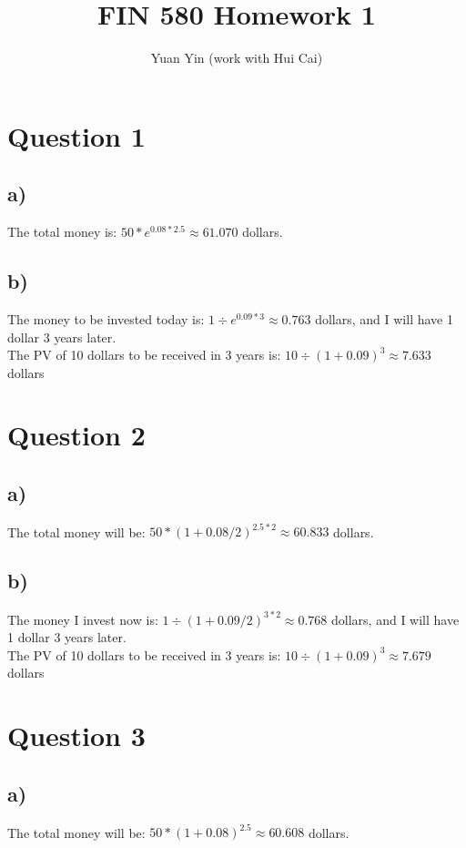 \documentclass[letterpaper,11pt]{article}
\author{Yuan Yin (work with Hui Cai)}
\title{FIN 580 Homework 1}
\begin{document}
\large
\maketitle
\begin{spacing}{1.2}  %
\section*{Question 1}
\subsection*{a)}
The total money is:
$50 * e^{0.08 * 2.5} \approx 61.070$
dollars.

\subsection*{b)}
The money to be invested today is:
$1 \div e^{0.09 * 3} \approx 0.763$
dollars, and I will have 1 dollar 3 years later.\\
The PV of 10 dollars to be received in 3 years is:
$10 \div (1 + 0.09)^3 \approx 7.633$
dollars

\section*{Question 2}
\subsection*{a)}
The total money will be:
$50 * (1 + 0.08 / 2)^{2.5 * 2} \approx 60.833$
dollars.

\subsection*{b)}
The money I invest now is:
$1 \div (1 + 0.09 / 2)^{3 * 2} \approx 0.768$
dollars, and I will have 1 dollar 3 years later.\\
The PV of 10 dollars to be received in 3 years is:
$10 \div (1+0.09)^3 \approx 7.679$
dollars

\section*{Question 3}
\subsection*{a)}
The total money will be:
$50 * (1 + 0.08) ^ 2.5 \approx 60.608$
dollars.


\end{spacing}
\end{document}
